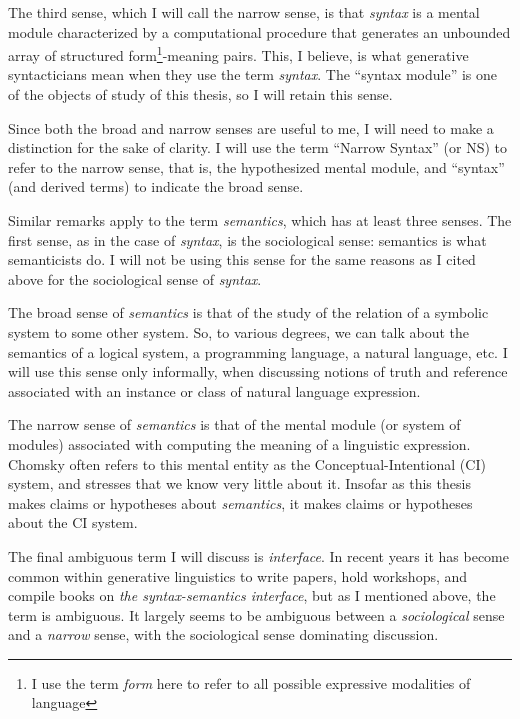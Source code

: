 \documentclass[MilwayThesis]{subfiles}
\begin{document}
The third sense, which I will call the narrow sense, is that \textit{syntax} is a mental module characterized by a computational procedure that generates an unbounded array of structured form\footnote{I use the term \textit{form} here to refer to all possible expressive modalities of language}-meaning pairs.
This, I believe, is what generative syntacticians mean when they use the term \textit{syntax}.
The ``syntax module'' is one of the objects of study of this thesis, so I will retain this sense.

Since both the broad and narrow senses are useful to me, I will need to make a distinction for the sake of clarity.
I will use the term ``Narrow Syntax'' (or NS) to refer to the narrow sense, that is, the hypothesized mental module, and ``syntax'' (and derived terms) to indicate the broad sense.

Similar remarks apply to the term \textit{semantics}, which has at least three senses.
The first sense, as in the case of \textit{syntax}, is the sociological sense: semantics is what semanticists do.
I will not be using this sense for the same reasons as I cited above for the sociological sense of \textit{syntax}.

The broad sense of \textit{semantics} is that of the study of the relation of a symbolic system to some other system.
So, to various degrees, we can talk about the semantics of a logical system, a programming language, a natural language, etc.
I will use this sense only informally, when discussing notions of truth and reference associated with an instance or class of natural language expression.

The narrow sense of \textit{semantics} is that of the mental module (or system of modules) associated with computing the meaning of a linguistic expression.
Chomsky often refers to this mental entity as the Conceptual-Intentional (CI) system, and stresses that we know very little about it.
Insofar as this thesis makes claims or hypotheses about \textit{semantics}, it makes claims or hypotheses about the CI system.

The final ambiguous term I will discuss is \textit{interface}.
In recent years it has become common within generative linguistics to write papers, hold workshops, and compile books on \textit{the syntax-semantics interface}, but as I mentioned above, the term is ambiguous.
It largely seems to be ambiguous between a \textit{sociological} sense and a \textit{narrow} sense, with the sociological sense dominating discussion.
\end{document}
